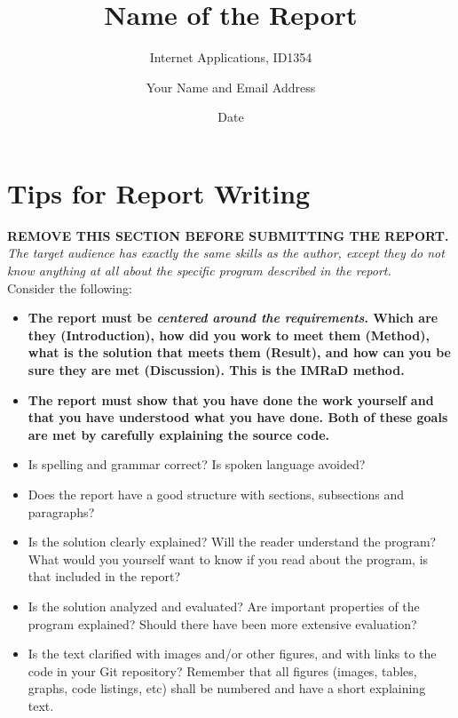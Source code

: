 \documentclass[a4paper]{scrartcl}
\title{Name of the Report}
\subtitle{Internet Applications, ID1354}
\author{Your Name and Email Address}
\date{Date}
\begin{document}
\maketitle

\section*{Tips for Report Writing}
\textbf{REMOVE THIS SECTION BEFORE SUBMITTING THE REPORT.}\\

\noindent \textit{The target audience has exactly the same skills as the author, except they do not know anything at all about the specific program described in the report.} \\

Consider the following:

\begin{itemize}
  \item \textbf{The report must be \textit{centered around the requirements}. Which are they (Introduction), how did you work to meet them (Method), what is the solution that meets them (Result), and how can you be sure they are met (Discussion). This is the IMRaD method.}

  \item \textbf{The report must show that you have done the work yourself and that you have understood what you have done. Both of these goals are met by carefully explaining the source code.}

  \item Is spelling and grammar correct? Is spoken language avoided?

  \item Does the report have a good structure with sections, subsections and paragraphs?

  \item Is the solution clearly explained? Will the reader understand the program? What would you yourself want to know if you read about the program, is that included in the report?

  \item Is the solution analyzed and evaluated? Are important properties of the program explained? Should there have been more extensive evaluation?

  \item Is the text clarified with images and/or other figures, and with links to the code in your Git repository? Remember that all figures (images, tables, graphs, code listings, etc) shall be numbered and have a short explaining text.
\end{itemize}
\end{document}
